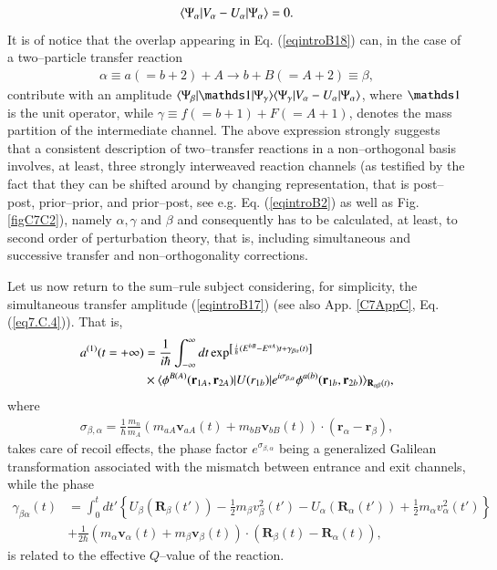 \begin{align}
\langle {\Psi_\alpha|V_\alpha-U_\alpha|\Psi_\alpha} \rangle=0.
\end{align}
It is of notice that the overlap appearing in Eq. (\ref{eqintroB18}) can, in the case of a two--particle transfer reaction 
\begin{align}
\alpha\equiv a (=b+2)+A\rightarrow b+B(=A+2)\equiv\beta,
\end{align}
contribute with an amplitude $\braket{\Psi_\beta|\idop|\Psi_\gamma}\braket{\Psi_\gamma|V_\alpha-U_\alpha|\Psi_\alpha}$, where $\idop$ is the unit operator, while $\gamma\equiv f(=b+1)+F(=A+1)$, denotes the mass partition of the intermediate channel. The above expression strongly suggests that a consistent description of two--transfer reactions in a non--orthogonal basis involves, at least, three strongly interweaved  reaction channels (as testified by the fact that they can be shifted around by changing representation, that is post--post, prior--prior, and prior--post, see e.g. Eq. (\ref{eqintroB2}) as well as Fig. \ref{figC7C2}), namely $\alpha,\gamma$ and $\beta$ and consequently has to be calculated, at least, to second order of perturbation theory, that is, including simultaneous and successive transfer and non--orthogonality corrections.

Let us now return to the sum--rule subject considering,  for simplicity, the simultaneous transfer amplitude (\ref{eqintroB17}) (see also App. \ref{C7AppC}, Eq. (\ref{eq7.C.4})). That is,
\begin{align}\label{eqintroB19}
\nonumber a^{(1)}(t=+\infty)&=\frac{1}{i\hbar}\int^{\infty}_{-\infty}dt\exp^{\left[\frac{i}{\hbar}(E^{bB}-E^{aA})t+\gamma_{\beta\alpha}(t)\right]}\\
&\times\langle {\phi^{B(A)}(\mathbf r_{1A},\mathbf r_{2A})|U(r_{1b})|e^{i\sigma_{\beta,\alpha}}\phi^{a(b)}(\mathbf r_{1b},\mathbf r_{2b})} \rangle_{\mathbf R_{\alpha\beta}(t)},
\end{align}
where
\begin{align}
\sigma_{\beta,\alpha}=\frac{1}{\hbar}\frac{m_n}{m_A}(m_{aA}\mathbf v_{aA}(t)+m_{bB}\mathbf v_{bB}(t))\cdot(\mathbf r_\alpha-\mathbf r_\beta),
\end{align}
takes care of recoil effects, the phase factor $e^{\sigma_{\beta,\alpha}}$ being a generalized Galilean transformation associated with the mismatch between entrance and exit channels,  while the phase
\begin{align}\label{eqintroB21}
\nonumber\gamma_{\beta\alpha}(t)&=\int^t_0 dt'\left\{U_\beta(\mathbf R_{\beta}(t'))-\frac{1}{2}m_\beta v_\beta^2(t')-U_\alpha(\mathbf R_\alpha(t'))+\frac{1}{2}m_\alpha v_\alpha^2(t')\right\}\\
&+\frac{1}{2\hbar}\left(m_\alpha \mathbf v_\alpha(t)+m_\beta \mathbf v_\beta(t) \right)\cdot(\mathbf R_\beta(t)-\mathbf R_\alpha(t)),
\end{align}
is related to the effective $Q$--value of the reaction.


